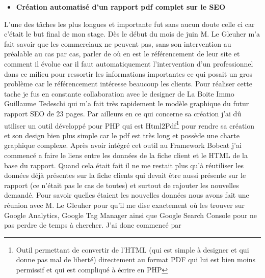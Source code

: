 \documentclass[12pt]{article}
\begin{document}
\begin{itemize}
\item \textbf{Création automatisé d'un rapport pdf complet sur le SEO }
\end{itemize}
L'une des tâches les plus longues et importante fut sans aucun doute celle ci car c'était le but final de mon stage. Dès le début du mois de juin M. Le Gleuher m'a fait savoir que les commerciaux ne peuvent pas, sans son intervention au préalable au cas par cas, parler de où en est le référencement de leur site et comment il évolue car il faut automatiquement l'intervention d'un professionnel dans ce milieu pour ressortir les informations importantes ce qui posait un gros problème car le référencement intéresse beaucoup les clients. \newline
Pour réaliser cette tache je fus en constante collaboration avec le designer de La Boite Immo Guillaume Tedeschi qui m'a fait très rapidement le modèle graphique du futur rapport SEO de 23 pages. 
Par ailleurs en ce qui concerne sa création j'ai dû utiliser un outil développé pour PHP qui est Html2Pdf\footnote{Outil permettant de convertir de l'HTML (qui est simple à designer et qui donne pas mal de liberté) directement au format PDF qui lui est bien moins permissif et qui est compliqué à écrire en PHP} pour rendre sa création et son design bien plus simple car le pdf est très long et possède une charte graphique complexe. Après avoir intégré cet outil au Framework Bobcat j'ai commencé a faire le liens entre les données de la fiche client et le HTML de la base du rapport. Quand cela était fait il ne me restait plus qu'à réutiliser les données déjà présentes sur la fiche clients qui devait être aussi présente sur le rapport (ce n'était pas le cas de toutes) et surtout de rajouter les nouvelles demandé. Pour savoir quelles étaient les nouvelles données nous avons fait une réunion avec M. Le Gleuher pour qu'il me dise exactement où les trouver sur Google Analytics, Google Tag Manager ainsi que Google Search Console pour ne pas perdre de temps à chercher. J'ai donc commencé par 
\end{document}

